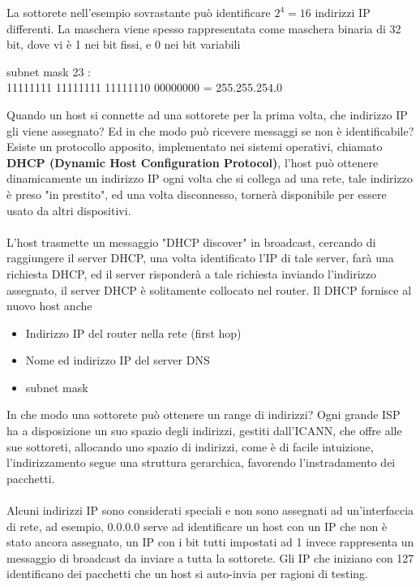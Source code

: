 \documentclass[12pt, letterpaper]{article}
\newcommand{\acc}{\\\hphantom{}\\}
\begin{document}
La sottorete nell'esempio sovrastante può identificare $2^4=16$ indirizzi IP differenti. La maschera viene spesso 
rappresentata come maschera binaria di 32 bit, dove vi è 1 nei bit fissi, e 0 nei bit variabili 
\begin{center}
    subnet mask 23 :\\ 11111111 11111111 11111110 00000000 = 255.255.254.0
\end{center}
Quando un host si connette ad una sottorete per la prima volta, che indirizzo IP gli viene assegnato? Ed in che modo 
può ricevere messaggi se non è identificabile? Esiste un protocollo apposito, implementato nei sistemi operativi, chiamato 
\textbf{DHCP (Dynamic Host Configuration Protocol)}, l'host può ottenere dinamicamente un indirizzo IP ogni volta che 
si collega ad una rete, tale indirizzo è preso "in prestito", ed una volta disconnesso, tornerà disponibile per 
essere usato da altri dispositivi. \acc 
L'host trasmette un messaggio "DHCP discover" in broadcast, cercando di raggiungere il server DHCP, una volta identificato l'IP 
di tale server, farà una richiesta DHCP, ed il server risponderà a tale richiesta inviando l'indirizzo assegnato, il server 
DHCP è solitamente collocato nel router. Il DHCP fornisce al nuovo host anche\begin{itemize}
    \item Indirizzo IP del router nella rete (first hop)
    \item Nome ed indirizzo IP del server DNS 
    \item subnet mask
\end{itemize}
In che modo una sottorete può ottenere un range di indirizzi? Ogni grande ISP ha a disposizione un suo spazio degli 
indirizzi, gestiti dall'ICANN, che offre alle sue sottoreti, allocando uno spazio di indirizzi, come è di facile intuizione, l'indirizzamento 
segue una struttura gerarchica, favorendo l'instradamento dei pacchetti.\acc 
Alcuni indirizzi IP sono considerati speciali e non sono assegnati ad un'interfaccia di rete, ad esempio, 0.0.0.0 serve 
ad identificare un host con un IP che non è stato ancora assegnato, un IP con i bit tutti impostati ad 1 invece 
rappresenta un messaggio di broadcast da inviare a tutta la sottorete. Gli IP che iniziano con 127 identificano dei pacchetti 
che un host si auto-invia per ragioni di testing.
\end{document}
